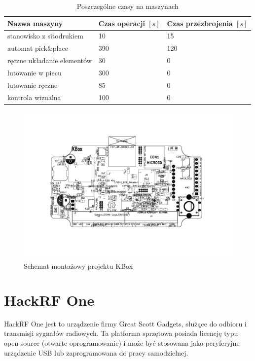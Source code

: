 \begin{table}[H]
	\centering
	\caption{Poszczególne czasy na maszynach}
	\begin{tabular}{lll}
		\toprule
		Nazwa maszyny                 & Czas operacji $[s]$ & Czas przezbrojenia $[s]$ \\
		\midrule
		stanowisko z sitodrukiem      & 10                  & 15                       \\
		automat pick\&place           & 390                 & 120                      \\
		ręczne układanie elementów & 30                  & 0                        \\
		lutowanie w piecu             & 300                 & 0                        \\
		lutowanie ręczne             & 85                  & 0                        \\
		kontrola wizualna             & 100                 & 0                        \\
		\bottomrule
	\end{tabular}
\end{table}

\begin{figure}[H]
	\centering
	\includegraphics[scale=0.7,clip, trim=3.8cm 4cm 3.8cm 3cm]{chapters/chapter5/kbox-rotated.pdf}
	\caption{Schemat montażowy projektu KBox}
	\label{kbox}
\end{figure}

\newpage
\section{HackRF One}
HackRF One jest to urządzenie firmy Great Scott Gadgets, służące do odbioru i transmisji sygnałów radiowych. Ta platforma sprzętowa posiada licencję typu open-source (otwarte oprogramowanie) i może być stosowana jako peryferyjne urządzenie USB lub zaprogramowana do pracy samodzielnej.

